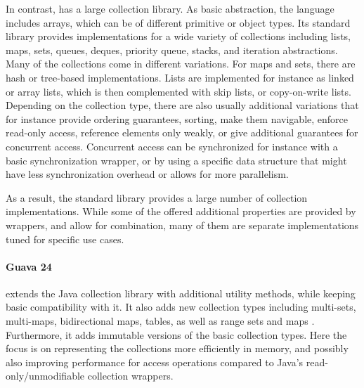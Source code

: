 \documentclass[sigconf, 10pt]{acmart}
\begin{document}

In contrast,  
has a large collection library.
As basic abstraction, the language includes arrays,
which can be of different primitive or object types.
Its standard library provides implementations for a wide variety of collections
including lists, maps, sets, queues, deques, priority queue, stacks,
and iteration abstractions. 
Many of the collections come in different variations.
For maps and sets, there are hash or tree-based implementations.
Lists are implemented for instance as linked or array lists,
which is then complemented with skip lists, or copy-on-write lists.
Depending on the collection type,
there are also usually additional variations that for instance
provide ordering guarantees, sorting, make them navigable,
enforce read-only access, reference elements only weakly,
or give additional guarantees for concurrent access.
Concurrent access can be synchronized
for instance with a basic synchronization wrapper,
or by using a specific data structure
that might have less synchronization overhead
or allows for more parallelism.

As a result,
the standard library provides a large number of collection implementations.
While some of the offered additional properties are provided by wrappers,
and allow for combination,
many of them are separate implementations tuned for specific use cases.

\paragraph{Guava 24}

extends the Java collection library with additional utility methods,
while keeping basic compatibility with it.
It also adds new collection types including multi-sets, multi-maps, 
bidirectional maps, tables, as well as range sets and maps .
Furthermore, it adds immutable versions of the basic collection types.
Here the focus is on representing the collections more efficiently in memory,
and possibly also improving performance for access operations
compared to Java's read-only/unmodifiable collection wrappers.
\end{document}
